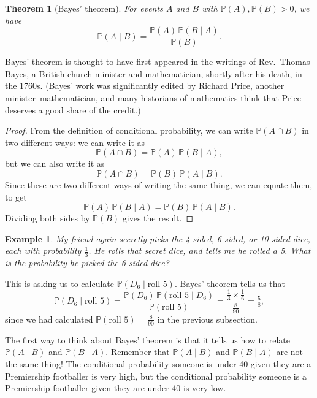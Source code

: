 \documentclass[
  a4paper,
]{book}
\newtheorem{theorem}{Theorem}[chapter]
\theoremstyle{definition}
\theoremstyle{definition}
\newtheorem{example}{Example}[chapter]
\theoremstyle{definition}
\theoremstyle{definition}
\theoremstyle{remark}
\begin{document}
\begin{theorem}[Bayes' theorem]
\protect\hypertarget{thm:thbayes}{}\label{thm:thbayes}For events \(A\) and \(B\) with \(\mathbb P(A), \mathbb P(B) > 0\), we have
\[ \mathbb P(A \mid B) = \frac{\mathbb P(A) \,\mathbb P(B \mid A)}{\mathbb P(B)} .  \]
\end{theorem}

Bayes' theorem is thought to have first appeared in the writings of Rev.~\href{https://mathshistory.st-andrews.ac.uk/Biographies/Bayes/}{Thomas Bayes}, a British church minister and mathematician, shortly after his death, in the 1760s. (Bayes' work was significantly edited by \href{https://mathshistory.st-andrews.ac.uk/Biographies/Price/}{Richard Price}, another minister--mathematician, and many historians of mathematics think that Price deserves a good share of the credit.)

\begin{proof}
From the definition of conditional probability, we can write \(\mathbb P(A \cap B)\) in two different ways: we can write it as
\[  \mathbb P(A \cap B) = \mathbb P(A) \, \mathbb P(B\mid A) , \]
but we can also write it as
\[  \mathbb P(A \cap B) = \mathbb P(B) \, \mathbb P(A\mid B) . \]
Since these are two different ways of writing the same thing, we can equate them, to get
\[ \mathbb P(A) \, \mathbb P(B\mid A) = \mathbb P(B) \, \mathbb P(A\mid B) . \]
Dividing both sides by \(\mathbb P(B)\) gives the result.
\end{proof}

\begin{example}
\emph{My friend again secretly picks the 4-sided, 6-sided, or 10-sided dice, each with probability \(\frac13\). He rolls that secret dice, and tells me he rolled a 5. What is the probability he picked the 6-sided dice?}

This is asking us to calculate \(\mathbb P(D_6 \mid \text{roll 5})\). Bayes' theorem tells us that
\[
  \mathbb P(D_6 \mid \text{roll 5})
  = \frac{\mathbb P(D_6) \, \mathbb P(\text{roll 5} \mid D_6)}{\mathbb P(\text{roll 5})} 
  = \frac{\frac13 \times \frac16}{\frac{8}{90}} 
  = \tfrac{5}{8} ,
\]
since we had calculated \(\mathbb P(\text{roll 5}) = \frac{8}{90}\) in the previous subsection.
\end{example}

The first way to think about Bayes' theorem is that it tells us how to relate \(\mathbb P(A \mid B)\) and \(\mathbb P(B \mid A)\). Remember that \(\mathbb P(A \mid B)\) and \(\mathbb P(B \mid A)\) are not the same thing! The conditional probability someone is under 40 given they are a Premiership footballer is very high, but the conditional probability someone is a Premiership footballer given they are under 40 is very low.
\end{document}
